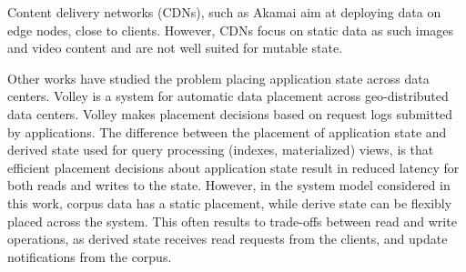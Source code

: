 Content delivery networks (CDNs), such as Akamai \cite{nygren:akamai} aim at deploying data on edge nodes,
close to clients.
However, CDNs focus on static data as such images and video content and are not well suited for mutable state.

Other works have studied the problem placing application state across data centers.
Volley \cite{agarwal:volley} is a system for automatic data placement across geo-distributed data centers.
Volley makes placement decisions based on request logs submitted by applications.
The difference between the placement of application state and derived state used for query processing (indexes, materialized)
views, is that efficient placement decisions about application state result in reduced latency for both reads and writes
to the state.
However, in the system model considered in this work, corpus data has a static placement,
while derive state can be flexibly placed across the system.
This often results to trade-offs between read and write operations,
as derived state receives read requests from the clients, and update notifications from the corpus.




